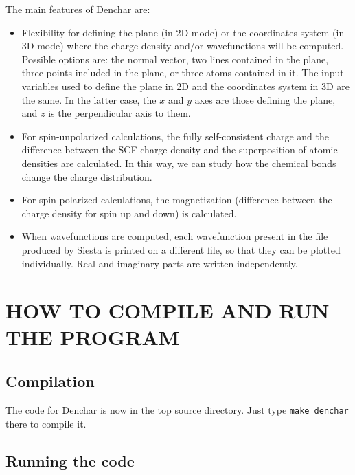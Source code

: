The main features of {\sc Denchar} are:
\begin{itemize}

\item
Flexibility for defining the plane (in 2D mode) or the
coordinates system (in 3D mode) where the charge density and/or
wavefunctions will be computed.
Possible options are: the normal vector, 
two lines contained in the plane,
three points included in the plane,
or three atoms contained in it.
The input variables used to define the plane in 2D and the
coordinates system in 3D are the same. In the latter case, the
$x$ and $y$ axes are those defining the plane, and $z$ is
the perpendicular axis to them.

\item
For spin-unpolarized calculations, the fully self-consistent charge and
the difference between the SCF charge density and the superposition of atomic
densities are calculated. In this way, we can study how the chemical bonds 
change the charge distribution.
 
\item
For spin-polarized calculations, the magnetization (difference between
the charge density for spin up and down) is calculated.

\item
When wavefunctions are computed, each wavefunction present in the
file produced by {\sc Siesta} is printed on a different file, 
so that they can be plotted individually. Real and imaginary
parts are written independently.

\end{itemize}

\section{HOW TO COMPILE AND RUN THE PROGRAM}

\subsection{Compilation}

The code for {\sc Denchar} is now in the top source directory. Just
type {\tt make denchar} there to compile it.


\subsection{Running the code}

